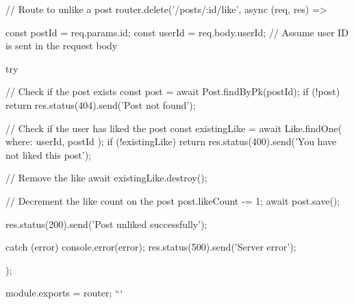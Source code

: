 // Route to unlike a post
router.delete('/posts/:id/like', async (req, res) => {
  const postId = req.params.id;
  const userId = req.body.userId; // Assume user ID is sent in the request body

  try {
    // Check if the post exists
    const post = await Post.findByPk(postId);
    if (!post) {
      return res.status(404).send('Post not found');
    }

    // Check if the user has liked the post
    const existingLike = await Like.findOne({ where: { userId, postId } });
    if (!existingLike) {
      return res.status(400).send('You have not liked this post');
    }

    // Remove the like
    await existingLike.destroy();

    // Decrement the like count on the post
    post.likeCount -= 1;
    await post.save();

    res.status(200).send('Post unliked successfully');
  } catch (error) {
    console.error(error);
    res.status(500).send('Server error');
  }
});

module.exports = router;
```

